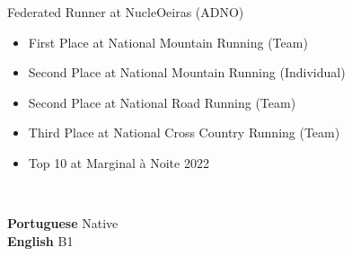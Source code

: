 \documentclass[10pt,a4paper,ragged2e,withhyper]{altacv}
\begin{document}
\begin{paracol}{2}
Federated Runner at NucleOeiras (ADNO)

\begin{itemize}

\item First Place at National Mountain Running (Team)
\item Second Place at National Mountain Running (Individual)
\item Second Place at National Road Running (Team)
\item Third Place at National Cross Country Running (Team)
\item Top 10 at Marginal à Noite 2022 

\end{itemize}











\divider




\switchcolumn


\\


	\vspace{1.2mm}
	\small \textbf{Portuguese} \hfill {Native \hspace{3pt}} \\
	
	\vspace{1mm}
	\small \textbf{English} \hfill{B1\hspace{3pt}}
	\vspace{1.2mm}
	

\end{paracol}
\end{document}
